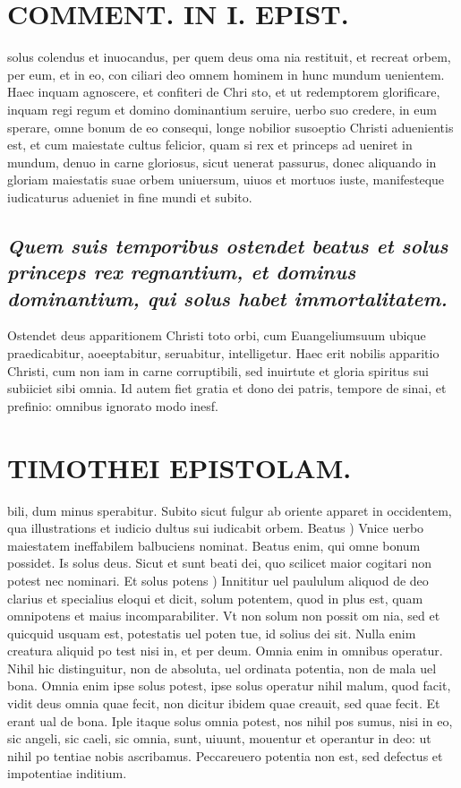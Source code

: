 \documentclass{article}
\begin{document}
\begin{pages}
\section*{COMMENT. IN I. EPIST. }
\marginpar{[ p.174 ]}\pstart solus colendus et inuocandus, per quem deus oma nia restituit, et recreat orbem, per eum, et in eo, con ciliari deo omnem hominem in hunc mundum uenientem. Haec inquam agnoscere, et confiteri de Chri sto, et ut redemptorem glorificare, inquam regi regum et domino dominantium seruire, uerbo suo credere, in eum sperare, omne bonum de eo consequi, longe nobilior susoeptio Christi aduenientis est, et cum maiestate cultus felicior, quam si rex et princeps ad ueniret in mundum, denuo in carne gloriosus, sicut uenerat passurus, donec aliquando in gloriam maiestatis suae orbem uniuersum, uiuos et mortuos iuste, manifesteque iudicaturus adueniet in fine mundi et subito.  \pend
{}
{}
\subsection*{\textit{Quem suis temporibus ostendet beatus et solus princeps rex regnantium, et dominus dominantium, qui solus habet immortalitatem. }}\pstart Ostendet deus apparitionem Christi toto orbi, cum Euangeliumsuum ubique praedicabitur, aoeeptabitur, seruabitur, intelligetur. Haec erit nobilis apparitio Christi, cum non iam in carne corruptibili, sed inuirtute et gloria spiritus sui subiiciet sibi omnia. Id autem fiet gratia et dono dei patris, tempore de sinai, et prefinio: omnibus ignorato modo inesf.  \pend
\section*{TIMOTHEI EPISTOLAM. }
\marginpar{[ p.175 ]}\pstart bili, dum minus sperabitur. Subito sicut fulgur ab oriente apparet in occidentem, qua illustrations et iudicio dultus sui iudicabit orbem.  \pend\pstart Beatus ) Vnice uerbo maiestatem ineffabilem balbuciens nominat. Beatus enim, qui omne bonum possidet. Is solus deus. Sicut et sunt beati dei, quo scilicet maior cogitari non potest nec nominari.  \pend\pstart Et solus potens ) Innititur uel paululum aliquod de deo clarius et specialius eloqui et dicit, solum potentem, quod in plus est, quam omnipotens et maius incomparabiliter. Vt non solum non possit om nia, sed et quicquid usquam est, potestatis uel poten tue, id solius dei sit. Nulla enim creatura aliquid po test nisi in, et per deum. Omnia enim in omnibus operatur. Nihil hic distinguitur, non de absoluta, uel ordinata potentia, non de mala uel bona. Omnia enim ipse solus potest, ipse solus operatur nihil malum, quod facit, vidit deus omnia quae fecit, non dicitur ibidem quae creauit, sed quae fecit. Et erant ual de bona. Iple itaque solus omnia potest, nos nihil pos sumus, nisi in eo, sic angeli, sic caeli, sic omnia, sunt, uiuunt, mouentur et operantur in deo: ut nihil po tentiae nobis ascribamus. Peccareuero potentia non est, sed defectus et impotentiae inditium.  \pend

\end{pages}
\end{document}
